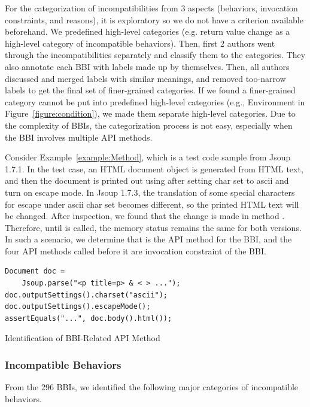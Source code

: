 For the categorization of incompatibilities from 3 aspects (behaviors, invocation constraints, and reasons), it is exploratory so we do not have a criterion available beforehand. We predefined high-level categories (e.g. return value change as a high-level category of incompatible behaviors). Then, first 2 authors went through the incompatibilities separately and classify them to the categories. They also annotate each BBI with labels made up by themselves. Then, all authors discussed and merged labels with similar meanings, and removed too-narrow labels to get the final set of finer-grained categories. If we found a finer-grained category cannot be put into predefined high-level categories (e.g., Environment in Figure~\ref{figure:condition}), we made them separate high-level categories. Due to the complexity of BBIs, the categorization process is not easy, especially when the BBI involves multiple API methods. 

Consider Example~\ref{example:Method}, which is a test code sample from Jsoup 1.7.1. In the test case, an HTML document object is generated from HTML text, and then the document is printed out using  after setting char set to ascii and turn on escape mode. In Jsoup 1.7.3, the translation of some special characters for escape under ascii char set becomes different, so the printed HTML text will be changed. After inspection, we found that the change is made in method . Therefore, until  is called, the memory status remains the same for both versions. In such a scenario, we determine that  is the API method for the BBI, and the four API methods called before it are invocation constraint of the BBI. 

\begin{example}
	\begin{verbatim}
Document doc = 
    Jsoup.parse("<p title=p> & < > ...");
doc.outputSettings().charset("ascii");
doc.outputSettings().escapeMode();
assertEquals("...", doc.body().html());
	\end{verbatim}
	\caption{Identification of BBI-Related API Method} 
	\label{example:Method} 
\end{example}

\subsubsection{Incompatible Behaviors}

From the 296 BBIs, we identified the following major categories of incompatible behaviors. 

